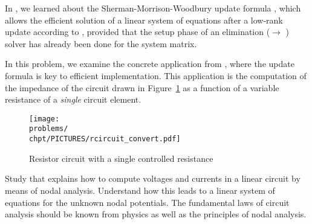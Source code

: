 \renewcommand{\chpt}{ch_directmethodslse}

\begin{problem}\label{prb:cimp}
  In , we learned about the Sherman-Morrison-Woodbury update formula
  , which allows the efficient solution of a linear system of
  equations after a low-rank update according to , provided that the
  setup phase of an elimination ($\to$ ) solver has already been
  done for the system matrix.

  In this problem, we examine the concrete application from , where
  the update formula is key to efficient implementation. This application is the 
  computation of the impedance of the circuit drawn in Figure~\ref{fig:rcircuit} 
  as a function of a variable resistance of a \emph{single} circuit element.

  \begin{figure}[h]
    \centering
    \texttt{[image: \\problems/\\chpt/PICTURES/rcircuit\_convert.pdf]}
    \caption{Resistor circuit with a single controlled resistance}
    \label{fig:rcircuit}
  \end{figure}
  

\begin{subproblem}[2]\label{cimp:sp:1}
  Study  that explains how to compute voltages and currents in a
  linear circuit by means of nodal analysis. Understand how this leads to a linear
  system of equations for the unknown nodal potentials. The fundamental laws of
  circuit analysis should be known from physics as well as the principles of nodal
  analysis.
\end{subproblem}


\end{problem}
